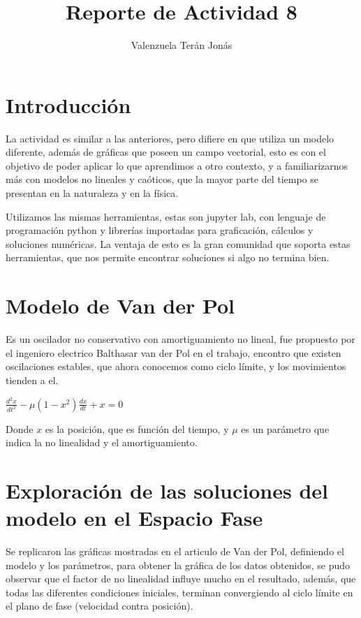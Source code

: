 \documentclass[a4paper]{article}
\title{Reporte de Actividad 8}
\author{Valenzuela Terán Jonás}
\begin{document}
\maketitle

\section{Introducción}

La actividad es similar a las anteriores, pero difiere en que utiliza un modelo diferente, además de gráficas que poseen un campo vectorial, esto es con el objetivo de poder aplicar lo que aprendimos a otro contexto, y a familiarizarnos más con modelos no lineales y caóticos, que la mayor parte del tiempo se presentan en la naturaleza y en la física.

Utilizamos las mismas herramientas, estas son jupyter lab, con lenguaje de programación python y librerías importadas para graficación, cálculos y soluciones numéricas. La ventaja de esto es la gran comunidad que soporta estas herramientas, que nos permite encontrar soluciones si algo no termina bien.


\section{Modelo de Van der Pol}

Es un oscilador no conservativo con amortiguamiento no lineal, fue propuesto por el ingeniero electrico Balthasar van der Pol en el trabajo, encontro que existen oscilaciones estables, que ahora conocemos como ciclo límite, y los movimientos tienden a el.

\begin{center}
	$\displaystyle \frac{d^2 x}{d t^2} - \mu (1 - x^2) \frac{dx}{dt} + x = 0$
\end{center}

Donde $x$ es la posición, que es función del tiempo, y $\mu$ es un parámetro que indica la no linealidad y el amortiguamiento.


\section{Exploración de las soluciones del modelo en el Espacio Fase}

Se replicaron las gráficas mostradas en el articulo de Van der Pol, definiendo el modelo y los parámetros, para obtener la gráfica de los datos obtenidos, se pudo observar que el factor de no linealidad influye mucho en el resultado, además, que todas las diferentes condiciones iniciales, terminan convergiendo al ciclo límite en el plano de fase (velocidad contra posición).
\end{document}
